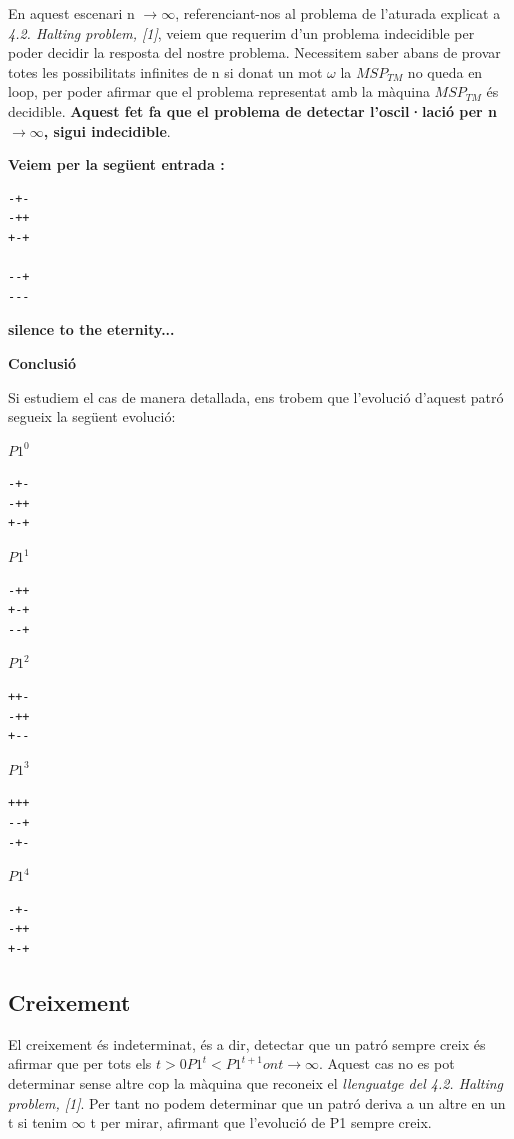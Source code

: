 \documentclass[12pt,a4paper]{report}
\def \w{$\omega$}
\def \tm{$MSP_{TM} $}
\begin{document}
En aquest escenari n $\rightarrow \infty$, referenciant-nos al problema de l’aturada explicat a \textit{4.2. Halting problem, [1]}, veiem que requerim d'un problema indecidible per poder decidir la resposta del nostre problema. Necessitem saber abans de provar totes les possibilitats infinites de n si donat un mot \w{} la \tm{} no queda en loop, per poder afirmar que el problema representat amb la màquina \tm{} és decidible. \textbf{Aquest fet fa que el problema de detectar l'oscil·lació per n $\rightarrow \infty$,  sigui indecidible}.

\textbf{Veiem per la següent entrada :}

\begin{lstlisting}
-+-
-++
+-+

--+
---
\end{lstlisting}

\textbf{silence to the eternity...}

\textbf{Conclusió}

Si estudiem el cas de manera detallada, ens trobem que l'evolució d'aquest patró segueix la següent evolució:


$P1^0$
\begin{lstlisting}
-+-
-++
+-+
\end{lstlisting}

$P1^1$
\begin{lstlisting}
-++
+-+
--+
\end{lstlisting}

$P1^2$
\begin{lstlisting}
++-
-++
+--
\end{lstlisting}

$P1^3$
\begin{lstlisting}
+++
--+
-+-
\end{lstlisting}

$P1^4$
\begin{lstlisting}
-+-
-++
+-+
\end{lstlisting}


\subsection{Creixement}

El creixement és indeterminat, és a dir, detectar que un patró sempre creix és afirmar que per tots els $t > 0 P1^t < P1^{t+1} on t \rightarrow \infty$. Aquest cas no es pot determinar sense altre cop la màquina que reconeix el \textit{llenguatge del 4.2. Halting problem, [1]}. Per tant no podem determinar que un patró deriva a un altre en un t si tenim $\infty$ t per mirar, afirmant que l’evolució de P1 sempre creix.
\end{document}

